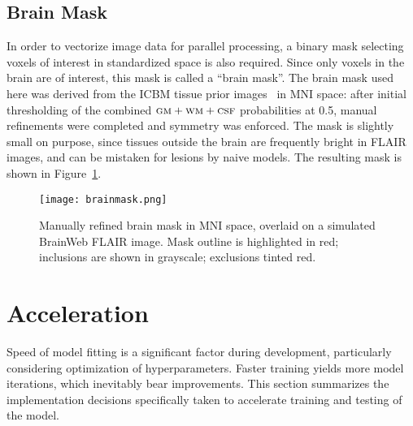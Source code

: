 \subsection{Brain Mask}\label{ss:brainmask}
In order to vectorize image data for parallel processing,
a binary mask selecting voxels of interest in standardized space is also required.
Since only voxels in the brain are of interest, this mask is called a ``brain mask''.
The brain mask used here was derived from
the ICBM tissue prior images~\cite{Mazziotta2001} in MNI space:
after initial thresholding of the combined $\textsc{gm}{}+\textsc{wm}{}+\textsc{csf}{}$ probabilities at 0.5,
manual refinements were completed and symmetry was enforced.
The mask is slightly small on purpose,
since tissues outside the brain are frequently bright in FLAIR images,
and can be mistaken for lesions by naive models.
The resulting mask is shown in Figure~\ref{fig:brainmask}.
\begin{figure}
  \centering
  \texttt{[image: brainmask.png]}
  \caption{Manually refined brain mask in MNI space, overlaid on a simulated BrainWeb FLAIR image.
    Mask outline is highlighted in red; inclusions are shown in grayscale; exclusions tinted red.}%
  \label{fig:brainmask}
\end{figure}
\section{Acceleration}
Speed of model fitting is a significant factor during development,
particularly considering optimization of hyperparameters.
Faster training yields more model iterations, which inevitably bear improvements.
This section summarizes the implementation decisions
specifically taken to accelerate training and testing of the model.
